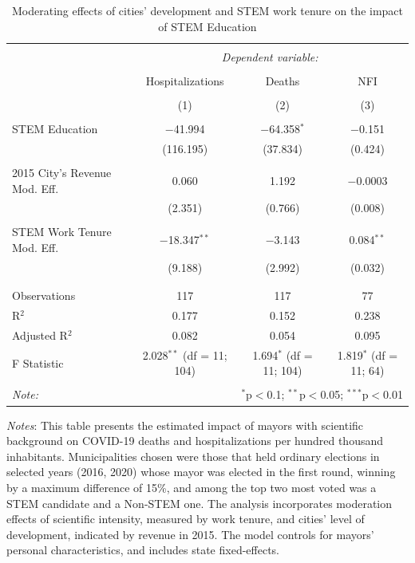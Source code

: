 \documentclass[
  letterpaper,
  DIV=11,
  numbers=noendperiod]{scrartcl}
\begin{document}
\begin{table}[!htbp] \centering 
  \caption{Moderating effects of cities’ development and STEM work tenure on the impact of STEM Education} 
  \label{} 
\begin{tabular}{@{\extracolsep{5pt}}lccc} 
\\[-1.8ex]\hline 
\hline \\[-1.8ex] 
 & \multicolumn{3}{c}{\textit{Dependent variable:}} \\ 
\cline{2-4} 
\\[-1.8ex] & Hospitalizations & Deaths & NFI \\ 
\\[-1.8ex] & (1) & (2) & (3)\\ 
\hline \\[-1.8ex] 
 STEM Education & $-$41.994 & $-$64.358$^{*}$ & $-$0.151 \\ 
  & (116.195) & (37.834) & (0.424) \\ 
  & & & \\ 
 2015 City's Revenue Mod. Eff. & 0.060 & 1.192 & $-$0.0003 \\ 
  & (2.351) & (0.766) & (0.008) \\ 
  & & & \\ 
 STEM Work Tenure Mod. Eff. & $-$18.347$^{**}$ & $-$3.143 & 0.084$^{**}$ \\ 
  & (9.188) & (2.992) & (0.032) \\ 
  & & & \\ 
\hline \\[-1.8ex] 
Observations & 117 & 117 & 77 \\ 
R$^{2}$ & 0.177 & 0.152 & 0.238 \\ 
Adjusted R$^{2}$ & 0.082 & 0.054 & 0.095 \\ 
F Statistic & 2.028$^{**}$ (df = 11; 104) & 1.694$^{*}$ (df = 11; 104) & 1.819$^{*}$ (df = 11; 64) \\ 
\hline 
\hline \\[-1.8ex] 
\textit{Note:}  & \multicolumn{3}{r}{$^{*}$p$<$0.1; $^{**}$p$<$0.05; $^{***}$p$<$0.01} \\ 
\end{tabular} 
\end{table}

\emph{Notes}: This table presents the estimated impact of mayors with
scientific background on COVID-19 deaths and hospitalizations per
hundred thousand inhabitants. Municipalities chosen were those that held
ordinary elections in selected years (2016, 2020) whose mayor was
elected in the first round, winning by a maximum difference of 15\%, and
among the top two most voted was a STEM candidate and a Non-STEM one.
The analysis incorporates moderation effects of scientific intensity,
measured by work tenure, and cities' level of development, indicated by
revenue in 2015. The model controls for mayors' personal
characteristics, and includes state fixed-effects.
\end{document}
